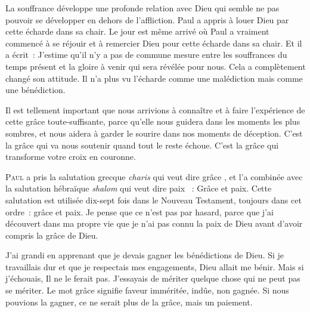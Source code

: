 
La souffrance développe une profonde relation avec Dieu qui semble
 ne pas pouvoir se développer en dehors de l'affliction.
 Paul a appris à louer Dieu par cette écharde dans sa chair.
 Le jour est même arrivé où Paul a vraiment commencé à se réjouir
 et à remercier Dieu pour cette écharde dans sa chair.
 Et il a écrit~: 
 \og J'estime qu'il n'y a pas de commune mesure entre les souffrances
 du temps présent et la gloire à venir qui sera révélée pour nous. \fg{}
 Cela a complètement changé son attitude. Il n'a plus vu l'écharde
 comme une malédiction mais comme une bénédiction.

Il est tellement important que nous arrivions à connaître
 et à faire l'expérience de cette grâce toute-suffisante,
 parce qu'elle nous guidera dans les moments les plus sombres,
 et nous aidera à garder le sourire dans nos moments de déception.
 C'est la grâce qui va nous soutenir quand tout le reste échoue.
 C'est la grâce qui transforme votre croix en couronne.

\dvrule






\lettrine{P}{aul} a pris la salutation grecque \emph{charis}
 qui veut dire \og grâce \fg{}, et l'a combinée avec la salutation
 hébraïque \emph{shalom} qui veut dire \og paix \fg{}~: 
 \og Grâce et paix. \fg{}
 Cette salutation est utilisée dix-sept fois dans le Nouveau Testament,
 toujours dans cet ordre~:  \og grâce et paix. \fg{}
 Je pense que ce n'est pas par hasard, parce que j'ai découvert
 dans ma propre vie que je n'ai pas connu la paix de Dieu
 avant d'avoir compris la grâce de Dieu.

J'ai grandi en apprenant que je devais gagner les bénédictions de Dieu.
 Si je travaillais dur et que je respectais mes engagements,
 Dieu allait me bénir. Mais si j'échouais, Il ne le ferait pas.
 J'essayais de mériter quelque chose qui ne peut pas se mériter.
 Le mot \og grâce \fg{} signifie \og faveur imméritée, indûe,
 non gagnée. \fg{} Si nous pouvions la gagner,
 ce ne serait plus de la grâce, mais un paiement.


